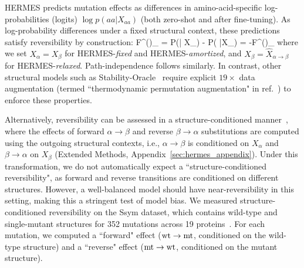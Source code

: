 HERMES predicts mutation effects as differences in amino-acid-specific log-probabilities (logits)
$\log p(aa | X_{aa})$ (both zero-shot and after fine-tuning). As log-probability differences under a
fixed structural context, these predictions satisfy reversibility by construction:
\EQ 
\Delta \hat F^{()}_{\alpha\to \beta} = \log P(\beta | X_{\beta}) - \log P(\alpha
|X_{\alpha}) = -\Delta \hat F^{()}_{\beta\to \alpha}
\label{eq:reversibility}
\EE
where we set $X_{\alpha}= X_{\beta}$ for HERMES-{\em fixed} and HERMES-{\em amortized}, and
$X_{\beta}= \hat X_{\alpha\to \beta}$ for HERMES-{\em relaxed}. Path-independence follows similarly.
In contrast, other structural models such as Stability-Oracle~\citep{diaz_stability_2024} require
explicit $19\times$ data augmentation (termed ``thermodynamic permutation augmentation" in
ref.~\citep{diaz_stability_2024}) to enforce these properties.

Alternatively, reversibility can be assessed in a structure-conditioned
manner~\citep{blaabjerg_rapid_2023, dieckhaus_transfer_2024}, where the effects of forward
$\alpha\to \beta$ and reverse $\beta \to \alpha$ substitutions are computed using the outgoing
structural contexts, i.e., $\alpha\to \beta$ is conditioned on $X_{\alpha}$ and $\beta\to\alpha$ on
$X_{\beta}$ (Extended Methods, Appendix~\ref{sec:hermes_appendix}). Under this transformation, we do
not automatically expect a
``structure-conditioned reversibility", as forward and reverse transitions are conditioned on
different structures. However, a well-balanced model should have near-reversibility in this setting,
making this a stringent test of model bias. We measured structure-conditioned reversibility on the
Ssym dataset, which contains wild-type and single-mutant structures for 352 mutations across 19
proteins~\citep{pancotti_predicting_2022}.
For each mutation, we computed a ``forward" effect (${\text{wt}} \to{\text{mt}}$, conditioned on the wild-type
structure) and a ``reverse" effect (${\text{mt}} \to{\text{wt}}$, conditioned on the mutant structure).


